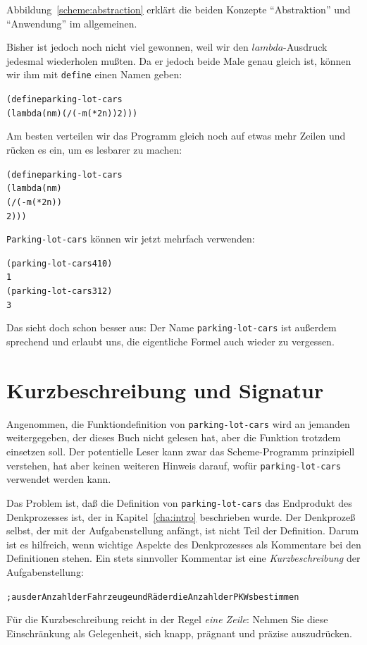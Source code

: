% 
Abbildung~\ref{scheme:abstraction} erklärt die beiden Konzepte
"`Abstraktion"' und "`Anwendung"' im allgemeinen.

Bisher ist jedoch noch nicht viel gewonnen, weil wir den
$lambda$-Ausdruck jedesmal wiederholen mußten.  Da er jedoch beide
Male genau gleich ist, können wir ihm mit \texttt{define} einen Namen
geben:
%
\begin{alltt}
(define parking-lot-cars
  (lambda (n m) (/ (- m (* 2 n)) 2)))
\end{alltt}
%
Am besten verteilen wir das Programm gleich noch auf etwas mehr Zeilen
und rücken es ein, um es lesbarer zu machen:
%
\begin{alltt}
(define parking-lot-cars
  (lambda (n m)
    (/ (- m (* 2 n))
       2)))
\end{alltt}
%
\texttt{Parking-lot-cars} können wir jetzt mehrfach verwenden:
%
\begin{alltt}
(parking-lot-cars 4 10)
\evalsto{} 1
(parking-lot-cars 3 12)
\evalsto{} 3
\end{alltt}
%
Das sieht doch schon besser aus: Der Name \texttt{parking-lot-cars}
ist außerdem sprechend und erlaubt uns, die eigentliche Formel auch
wieder zu vergessen.


\section{Kurzbeschreibung und Signatur}
\label{sec:sorts-and-contracts}

Angenommen, die Funktiondefinition von \texttt{parking-lot-cars} wird
an jemanden weitergegeben, der dieses Buch nicht gelesen hat, aber die
Funktion trotzdem einsetzen soll.  Der potentielle Leser kann zwar
das Scheme-Programm prinzipiell verstehen, hat aber keinen weiteren
Hinweis darauf, wofür \texttt{parking-lot-cars} verwendet werden kann.

Das Problem ist, daß die Definition von \texttt{parking-lot-cars} 
das Endprodukt des Denkprozesses ist, der in Kapitel~\ref{cha:intro}
beschrieben wurde.  Der Denkprozeß selbst, der mit der Aufgabenstellung
anfängt, ist nicht Teil der Definition.  Darum ist es hilfreich, wenn
wichtige Aspekte des Denkprozesses als Kommentare  bei den Definitionen
stehen.  Ein stets sinnvoller Kommentar ist eine \textit{Kurzbeschreibung} der
Aufgabenstellung:
%
\begin{alltt}
; aus der Anzahl der Fahrzeuge und Räder die Anzahl der PKWs bestimmen
\end{alltt}
%
Für die Kurzbeschreibung reicht in der Regel \emph{eine Zeile}: Nehmen
Sie diese Einschränkung als Gelegenheit, sich knapp, prägnant und
präzise auszudrücken.

